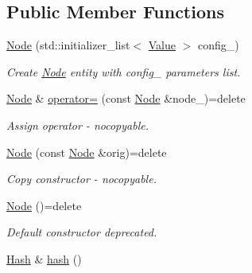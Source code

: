 \subsection*{Public Member Functions}
\begin{DoxyCompactItemize}
\item 
\mbox{\hyperlink{classeven_1_1_node_aca2546b6c444b3d774339e7b1fa17b8a}{Node}} (std\+::initializer\+\_\+list$<$ \mbox{\hyperlink{classeven_1_1_value}{Value}} $>$ config\+\_\+)
\begin{DoxyCompactList}\small\item\em Create \mbox{\hyperlink{classeven_1_1_node}{Node}} entity with config\+\_\+ parameters list. \end{DoxyCompactList}\item 
\mbox{\label{classeven_1_1_node_a47d0ebea758de17c2b60b1dd7aa59dcf}} 
\mbox{\hyperlink{classeven_1_1_node}{Node}} \& \mbox{\hyperlink{classeven_1_1_node_a47d0ebea758de17c2b60b1dd7aa59dcf}{operator=}} (const \mbox{\hyperlink{classeven_1_1_node}{Node}} \&node\+\_\+)=delete
\begin{DoxyCompactList}\small\item\em Assign operator -\/ nocopyable. \end{DoxyCompactList}\item 
\mbox{\label{classeven_1_1_node_a0498fbaf6031da93105da367e6cfb004}} 
\mbox{\hyperlink{classeven_1_1_node_a0498fbaf6031da93105da367e6cfb004}{Node}} (const \mbox{\hyperlink{classeven_1_1_node}{Node}} \&orig)=delete
\begin{DoxyCompactList}\small\item\em Copy constructor -\/ nocopyable. \end{DoxyCompactList}\item 
\mbox{\label{classeven_1_1_node_acacf932f144d7d18a8bba95a606efa1f}} 
\mbox{\hyperlink{classeven_1_1_node_acacf932f144d7d18a8bba95a606efa1f}{Node}} ()=delete
\begin{DoxyCompactList}\small\item\em Default constructor deprecated. \end{DoxyCompactList}\item 
\mbox{\label{classeven_1_1_node_a11e348eb39d7086f674886236a01d882}} 
\mbox{\hyperlink{classeven_1_1_hash}{Hash}} \& \mbox{\hyperlink{classeven_1_1_node_a11e348eb39d7086f674886236a01d882}{hash}} ()

\end{DoxyCompactItemize}
